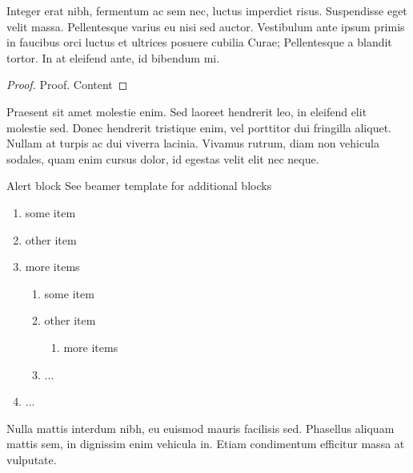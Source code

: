 \documentclass{beamer}
\begin{document}
\begin{frame}[t]
\begin{columns}[t]
\begin{column}{.49\textwidth}
		Integer erat nibh, fermentum ac sem nec, luctus imperdiet risus. Suspendisse eget velit massa. Pellentesque varius eu nisi sed auctor. Vestibulum ante ipsum primis in faucibus orci luctus et ultrices posuere cubilia Curae; Pellentesque a blandit tortor. In at eleifend ante, id bibendum mi. 
		
		\begin{proof}{Proof.}
		Content
		\end{proof}
		
		Praesent sit amet molestie enim. Sed laoreet hendrerit leo, in eleifend elit molestie sed. Donec hendrerit tristique enim, vel porttitor dui fringilla aliquet. Nullam at turpis ac dui viverra lacinia. Vivamus rutrum, diam non vehicula sodales, quam enim cursus dolor, id egestas velit elit nec neque. 
		
		\begin{alertblock}{Alert block}
		See beamer template for additional blocks
		\end{alertblock}
		
		\begin{enumerate}
		\item some item
		\item other item
		\item more items 
			\begin{enumerate}
			\item some item
			\item other item
				\begin{enumerate}
				\item more items 
				\end{enumerate}
			\item ...
			\end{enumerate}
		\item ...
		\end{enumerate}
	
		 Nulla mattis interdum nibh, eu euismod mauris facilisis sed. Phasellus aliquam mattis sem, in dignissim enim vehicula in. Etiam condimentum efficitur massa at vulputate.
	\end{column}
\end{columns}

\end{frame}
\end{document}

